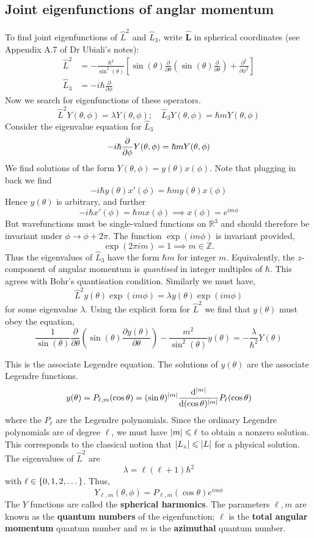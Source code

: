 \documentclass[a4paper,11pt]{article}
\begin{document}
\subsection{Joint eigenfunctions of anglar momentum}
To find joint eigenfunctions of $ \hat{L}^2 $ and $ \hat{L}_3 $, write $ \hat{\mathbf{L}} $ in spherical coordinates (see Appendix A.7 of Dr Ubiali's notes): 
\[
	\begin{aligned}
		\hat{L}^2 &=-\frac{\hbar^2}{\sin ^2(\theta)}\left[\sin (\theta) \frac{\partial}{\partial \theta}\left(\sin (\theta) \frac{\partial}{\partial \theta}\right)+\frac{\partial^2}{\partial \phi^2}\right] \\
		\hat{L}_3 &=-i \hbar \frac{\partial}{\partial \phi}
	\end{aligned}
\]
Now we search for eigenfunctions of these operators.
\[
	\hat L^2 Y(\theta, \phi) = \lambda Y(\theta, \phi);\quad \hat L_3 Y(\theta, \phi) = \hbar m Y(\theta, \phi)
\]
Consider the eigenvalue equation for $ \hat L_3 $
\[
	- i \hbar \pdv{}{\phi} Y(\theta,\phi) = \hbar m Y(\theta,\phi)
\] 
We find solutions of the form $ Y(\theta,\phi) = y(\theta) x(\phi) $. Note that plugging in back we find
\[
	-i\hbar y(\theta) x'(\phi) = \hbar m y(\theta) x(\phi)
\]
Hence \( y(\theta) \) is arbitrary, and further
\[
	-i\hbar x'(\phi) = \hbar m x(\phi) \implies x(\phi) = e^{i m \phi}
\]
But wavefunctions must be single-valued functions on $\mathbb{R}^3$ and should therefore be invariant under $\phi \rightarrow \phi+2 \pi$. The function $\exp (i m \phi)$ is invariant provided,
\[
\exp (2 \pi i m)=1  \implies  m \in \mathbb{Z}. 
\]
Thus the eigenvalues of $\hat{L}_3$ have the form $\hbar m$ for integer $m$. Equivalently, the $z$-component of angular momentum is \textit{quantised} in integer multiples of $\hbar$. This agrees with Bohr's quantisation condition.
Similarly we must have,
\[
\hat{L}^2 y(\theta) \exp (i m \phi)=\lambda y(\theta) \exp (i m \phi)
\]
for some eigenvalue $\lambda$. Using the explicit form for $\hat{L}^2$ we find that $y(\theta)$ must obey the equation,
\[
\frac{1}{\sin (\theta)} \frac{\partial}{\partial \theta}\left(\sin (\theta) \frac{\partial y(\theta)}{\partial \theta}\right)-\frac{m^2}{\sin ^2(\theta)} y(\theta)=-\frac{\lambda}{\hbar^2} Y(\theta)
\]

This is the associate Legendre equation.
The solutions of \( y(\theta) \) are the associate Legendre functions.
\[
	y(\theta) = P_{\ell,m}(\cos \theta) = (\sin \theta)^{\abs{m}} \dv[\abs{m}]{(\cos \theta)}  P_\ell(\cos \theta)
\]
where the \( P_\ell \) are the Legendre polynomials.
Since the ordinary Legendre polynomials are of degree \( \ell \), we must have \( \abs{m} \leqslant \ell \) to obtain a nonzero solution.
This corresponds to the classical notion that \( \abs{L_z} \leqslant \abs{L} \) for a physical solution.
The eigenvalues of \( \hat L^2 \) are
\[
	\lambda = \ell(\ell+1) \hbar^2
\]
with \( \ell \in \qty{0, 1, 2, \dots} \).
Thus,
\[
	Y_{\ell, m}(\theta, \phi) = P_{\ell,m}(\cos\theta) e^{im\phi}
\]
The \( Y \) functions are called the \textbf{spherical harmonics}.
The parameters \( \ell, m \) are known as the \textbf{quantum numbers} of the eigenfunction; \( \ell \) is the \textbf{total angular momentum} quantum number and \( m \) is the \textbf{azimuthal} quantum number.
\end{document}
